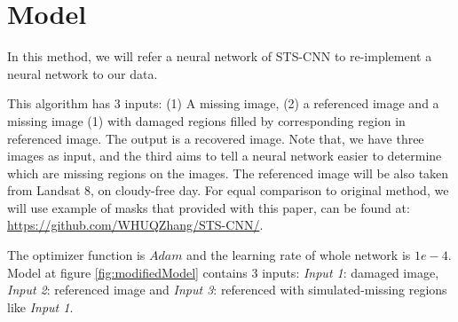 \section{Model}

In this method, we will refer a neural network of STS-CNN\cite{Zhang2018} to re-implement a neural network to our data. 

This algorithm has 3 inputs: (1) A missing image, (2) a referenced image and a missing image (1) with damaged regions filled by corresponding region in referenced image. The output is a recovered image. Note that, we have three images as input, and the third aims to tell a neural network easier to determine which are missing regions on the images. The referenced image will be also taken from Landsat 8, on cloudy-free day. For equal comparison to original method, we will use example of masks that provided with this paper, can be found at: \href{https://github.com/WHUQZhang/STS-CNN/}{https://github.com/WHUQZhang/STS-CNN/}.

The optimizer function is $Adam$ and the learning rate of whole network is $1e-4$. Model at figure \ref{fig:modifiedModel} contains 3 inputs: \textit{Input 1}: damaged image, \textit{Input 2}: referenced image and \textit{Input 3}: referenced with simulated-missing regions like \textit{Input 1}.

